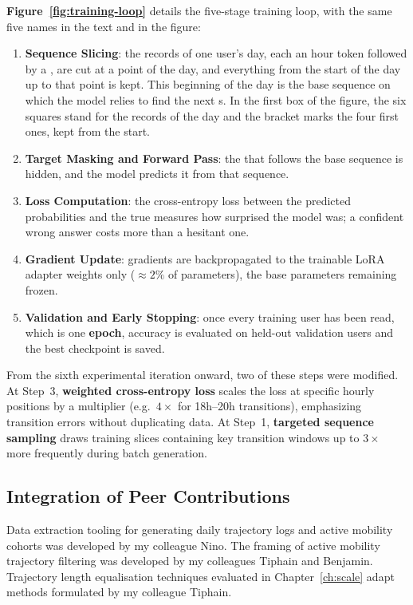 \textbf{Figure~\ref{fig:training-loop}} details the five-stage training loop, with the same five names in the text and in the figure:
\begin{enumerate}
  \item \textbf{Sequence Slicing}: the records of one user's day, each an hour token followed by a , are cut at a point of the day, and everything from the start of the day up to that point is kept. This beginning of the day is the base sequence on which the model relies to find the next s. In the first box of the figure, the six squares stand for the records of the day and the bracket marks the four first ones, kept from the start.
  \item \textbf{Target Masking and Forward Pass}: the  that follows the base sequence is hidden, and the model predicts it from that sequence.
  \item \textbf{Loss Computation}: the cross-entropy loss between the predicted probabilities and the true  measures how surprised the model was; a confident wrong answer costs more than a hesitant one.
  \item \textbf{Gradient Update}: gradients are backpropagated to the trainable LoRA adapter weights only ($\approx 2\%$ of parameters), the base parameters remaining frozen.
  \item \textbf{Validation and Early Stopping}: once every training user has been read, which is one \textbf{epoch}, accuracy is evaluated on held-out validation users and the best checkpoint is saved.
\end{enumerate}
From the sixth experimental iteration onward, two of these steps were modified. At Step~3, \textbf{weighted cross-entropy loss} scales the loss at specific hourly positions by a multiplier (e.g.\ $4\times$ for 18h--20h transitions), emphasizing transition errors without duplicating data. At Step~1, \textbf{targeted sequence sampling} draws training slices containing key transition windows up to $3\times$ more frequently during batch generation.



\subsection{Integration of Peer Contributions}

Data extraction tooling for generating daily trajectory logs and active mobility cohorts was developed by my colleague Nino. The framing of active mobility trajectory filtering was developed by my colleagues Tiphain and Benjamin. Trajectory length equalisation techniques evaluated in Chapter~\ref{ch:scale} adapt methods formulated by my colleague Tiphain.

